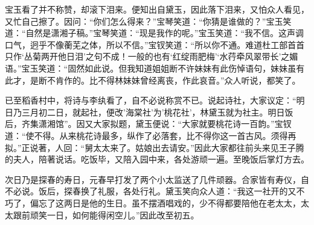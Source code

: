 \begin{parag}

    宝玉看了并不称赞，却滚下泪来。便知出自黛玉，因此落下泪来，又怕众人看见，又忙自己擦了。因问：“你们怎么得来？”宝琴笑道：“你猜是谁做的？”宝玉笑道：“自然是潇湘子稿。”宝琴笑道：“现是我作的呢。”宝玉笑道：“我不信。这声调口气，迥乎不像蘅芜之体，所以不信。”宝钗笑道：“所以你不通。难道杜工部首首只作‘丛菊两开他日泪’之句不成！一般的也有‘红绽雨肥梅’‘水荇牵风翠带长’之媚语。”宝玉笑道：“固然如此说。但我知道姐姐断不许妹妹有此伤悼语句，妹妹虽有此才，是断不肯作的。比不得林妹妹曾经离丧，作此哀音。”众人听说，都笑了。
\end{parag}


\begin{parag}


    已至稻香村中，将诗与李纨看了，自不必说称赏不已。说起诗社，大家议定：“明日乃三月初二日，就起社，便改'海棠社'为'桃花社'，林黛玉就为社主。明日饭后，齐集潇湘馆”。因又大家拟题，黛玉便说：“大家就要桃花诗一百韵。”宝钗道：“使不得。从来桃花诗最多，纵作了必落套，比不得你这一首古风。须得再拟。”正说著，人回：“舅太太来了。姑娘出去请安。”因此大家都往前头来见王子腾的夫人，陪著说话。吃饭毕，又陪入园中来，各处游顽一遍。至晚饭后掌灯方去。
\end{parag}


\begin{parag}


    次日乃是探春的寿日，元春早打发了两个小太监送了几件顽器。合家皆有寿仪，自不必说。饭后，探春换了礼服，各处行礼。黛玉笑向众人道：“我这一社开的又不巧了，偏忘了这两日是他的生日。虽不摆酒唱戏的，少不得都要陪他在老太太，太太跟前顽笑一日，如何能得闲空儿。”因此改至初五。
\end{parag}


